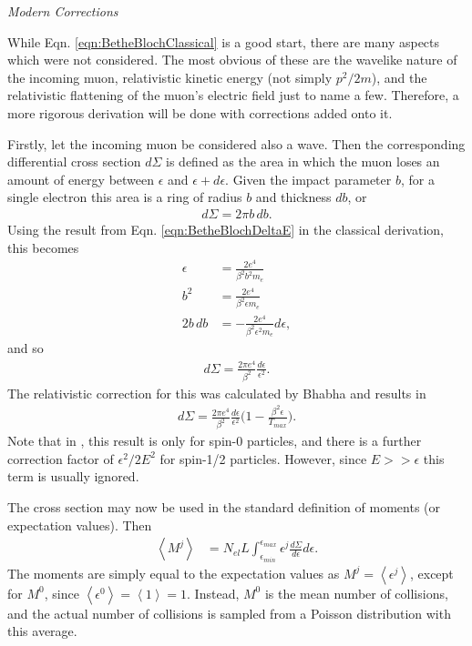 \noindent \textit{\large{Modern Corrections}}

\iffalse
While Eqn. \ref{eqn:BetheBlochClassical} is a good start, there are many aspects which were not considered. The most obvious of these are the wavelike nature of the incoming muon, relativistic kinetic energy (not simply $p^2/2m$), and the relativistic flattening of the muon's electric field just to name a few. Therefore, a more rigorous derivation will be done with corrections added onto it.

Firstly, let the incoming muon be considered also a wave. Then the corresponding differential cross section $d\Sigma$ is defined as the area in which the muon loses an amount of energy between $\epsilon$ and $\epsilon+d\epsilon$. Given the impact parameter $b$, for a single electron this area is a ring of radius $b$ and thickness $db$, or \cite{bichsel1968,bichsel1988}
\begin{align*}
d\Sigma=2\pi b \, db.
\end{align*}
Using the result from Eqn. \ref{eqn:BetheBlochDeltaE} in the classical derivation, this becomes
\begin{align*}
\epsilon &= \frac{2e^4}{\beta^2 b^2 m_e}\\
b^2 &= \frac{2e^4}{\beta^2 \epsilon m_e}\\
2b \, db &= -\frac{2e^4}{\beta^2 \epsilon^2 m_e}d\epsilon,
\end{align*}
and so
\begin{align*}
d\Sigma=\frac{2\pi e^4}{\beta^2} \frac{d\epsilon}{\epsilon ^2}.
\end{align*}
The relativistic correction for this was calculated by Bhabha \cite{uehling,bhabha} and results in
\begin{align*}
d\Sigma=\frac{2\pi e^4}{\beta^2} \frac{d\epsilon}{\epsilon ^2}\Big(1-\frac{\beta^2 \epsilon}{T_{max}}\Big).
\end{align*}
Note that in \cite{uehling}, this result is only for spin-0 particles, and there is a further correction factor of $\epsilon ^2 / 2E^2$ for spin-1/2 particles. However, since $E>>\epsilon$ this term is usually ignored.

The cross section may now be used in the standard definition of moments (or expectation values). Then
\begin{align} \label{eqn:StragglingMoments}
\left< M^j\right>&=N_{el} L \int_{\epsilon_{min}} ^{\epsilon_{max}} \epsilon^j \frac{d\Sigma}{d\epsilon} d\epsilon .
\end{align}
The moments are simply equal to the expectation values as $M^j=\left<\epsilon ^j \right>$, except for $M^0$, since $\left< \epsilon ^0 \right>=\left< 1 \right> = 1$. Instead, $M^0$ is the mean number of collisions, and the actual number of collisions is sampled from a Poisson distribution with this average.

